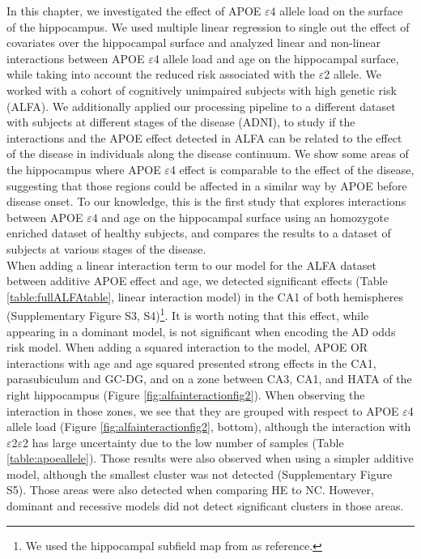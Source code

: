 In this chapter, we investigated the effect of APOE $\varepsilon4$ allele load on the surface of the hippocampus. We used multiple linear regression to single out the effect of covariates over the hippocampal surface and analyzed linear and non-linear interactions between APOE $\varepsilon$4 allele load and age on the hippocampal surface, while taking into account the reduced risk associated with the $\varepsilon$2 allele. We worked with a cohort of cognitively unimpaired subjects with high genetic risk (ALFA). We additionally applied our processing pipeline to a different dataset with subjects at different stages of the disease (ADNI), to study if the interactions and the APOE effect detected in ALFA can be related to the effect of the disease in individuals along the disease continuum. We show some areas of the hippocampus where APOE $\varepsilon$4 effect is comparable to the effect of the disease, suggesting that those regions could be affected in a similar way by APOE before disease onset. To our knowledge, this is the first study that explores interactions between APOE $\varepsilon4$ and age on the hippocampal surface using an homozygote enriched dataset of healthy subjects, and compares the results to a dataset of subjects at various stages of the disease. \\

When adding a linear interaction term to our model for the ALFA dataset between additive APOE effect and age, we detected significant effects (Table \ref{table:fullALFAtable}, linear interaction model) in the CA1 of both hemispheres (Supplementary Figure S3, S4)\footnote{We used the hippocampal subfield map from \cite{Iglesias2015} as reference.}. It is worth noting that this effect, while appearing in a dominant model, is not significant when encoding the AD odds risk model. When adding a squared interaction to the model, APOE OR interactions with age and age squared presented strong effects in the CA1, parasubiculum and GC-DG, and on a zone between CA3, CA1, and HATA of the right hippocampus (Figure \ref{fig:alfainteractionfig2}). When observing the interaction in those zones, we see that they are grouped with respect to APOE $\varepsilon$4 allele load (Figure \ref{fig:alfainteractionfig2}, bottom), although the interaction with $\varepsilon$2$\varepsilon$2 has large uncertainty due to the low number of samples (Table \ref{table:apoeallele}). Those results were also observed when using a simpler additive model, although the smallest cluster was not detected (Supplementary Figure S5). Those areas were also detected when comparing HE to NC. However, dominant and recessive models did not detect significant clusters in those areas. \\

